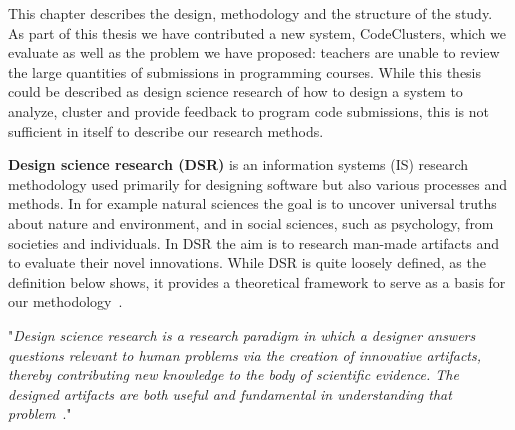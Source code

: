 This chapter describes the design, methodology and the structure of the study. As part of this thesis we have contributed a new system, CodeClusters, which we evaluate as well as the problem we have proposed: teachers are unable to review the large quantities of submissions in programming courses. While this thesis could be described as design science research of how to design a system to analyze, cluster and provide feedback to program code submissions, this is not sufficient in itself to describe our research methods.

\textbf{Design science research (DSR)} is an information systems (IS) research methodology used primarily for designing software but also various processes and methods. In for example natural sciences the goal is to uncover universal truths about nature and environment, and in social sciences, such as psychology, from societies and individuals. In DSR the aim is to research man-made artifacts and to evaluate their novel innovations. While DSR is quite loosely defined, as the definition below shows, it provides a theoretical framework to serve as a basis for our methodology~\cite{drs-in-is, drs-drm}.

\begin{displayquote}
\label{qt:dsr}
"\textit{Design science research is a research paradigm in which a designer answers questions relevant to human problems via the creation of innovative artifacts, thereby contributing new knowledge to the body of scientific evidence. The designed artifacts are both useful and fundamental in understanding that problem}~\cite{drs-in-is}."
\end{displayquote}

\iffalse
More sensible definition would be, that the goal in DSR is either to design a new artifact or an improvement to existing artifact to provide a (impartial) solution to a problem that is better than existing artifacts in some aspects. This in contrast to artifacts whose aims is to imitate existing designs without proposing improving the current designs. A more concrete analogue could be, that DSR is the designing process of product development while routine designs are reproductions of existing designs, more akin to manufacturing. Of course, designing in abstract is just the process of proposing 
\fi

